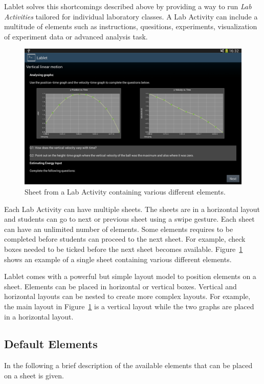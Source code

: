 \documentclass{sigchi}
\begin{document}
Lablet solves this shortcomings described above by providing a way to run {\em Lab Activities} tailored for individual laboratory classes.
A Lab Activity can include a multitude of elements such as instructions, quesitions, experiments, visualization of experiment data or advanced analysis task.

\begin{figure}[ht]
\centering
\includegraphics[width=.99\columnwidth]{LabActivitySheet}
\caption{Sheet from a Lab Activity containing various different elements.\label{fig:LabActivitySheet}
}
\end{figure}

Each Lab Activity can have multiple sheets.
The sheets are in a horizontal layout and students can go to next or previous sheet using a swipe gesture.
Each sheet can have an unlimited number of elements.
Some elements requires to be completed before students can proceed to the next sheet.
For example, check boxes needed to be ticked before the next sheet becomes available.
Figure~\ref{fig:LabActivitySheet} shows an example of a single sheet containing various different elements.

Lablet comes with a powerful but simple layout model to position elements on a sheet.
Elements can be placed in horizontal or vertical boxes.
Vertical and horizontal layouts can be nested to create more complex layouts.
For example, the main layout in Figure~\ref{fig:LabActivitySheet} is a vertical layout while the two graphs are placed in a horizontal layout.

\subsection{Default Elements}
In the following a brief description of the available elements that can be placed on a sheet is given.
\end{document}
